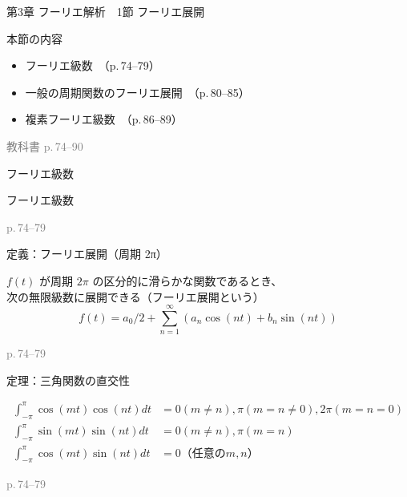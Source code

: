 \documentclass[aspectratio=43,professionalfonts,handout]{beamer}
\begin{document}
\begin{frame}{第3章 フーリエ解析　1節 フーリエ展開}
  \begin{block}{本節の内容}
  \begin{itemize}
    \item フーリエ級数　（p.\,74--79）
    \item 一般の周期関数のフーリエ展開　（p.\,80--85）
    \item 複素フーリエ級数　（p.\,86--89）
  \end{itemize}
  \end{block}
  \vfill\hfill{\scriptsize \textcolor{gray}{教科書 p.\,74--90}}
\end{frame}

\begin{frame}{フーリエ級数}
  \begin{block}{}
  {\large フーリエ級数}
  \end{block}
  \vfill\hfill{\scriptsize \textcolor{gray}{p.\,74--79}}
\end{frame}

\begin{frame}{定義：フーリエ展開（周期 2π）}
  \begin{block}{}
  $f(t)$ が周期 $2\pi$ の区分的に滑らかな関数であるとき、\\[2pt]
  次の無限級数に展開できる（フーリエ展開という）\\[2pt]
  \[
    f(t) = a_{0}/2 + \sum_{n=1}^\infty (a_{n}\cos(nt) + b_{n}\sin(nt))
  \]
  \end{block}
  \vfill\hfill{\scriptsize \textcolor{gray}{p.\,74--79}}
\end{frame}

\begin{frame}{定理：三角関数の直交性}
  \begin{block}{}
  \begin{align*}
    \int_{-\pi}^{\pi} \cos(mt)\cos(nt) dt &= { 0 (m \neq n), \pi (m = n \neq 0), 2\pi (m = n = 0) } \\
    \int_{-\pi}^{\pi} \sin(mt)\sin(nt) dt &= { 0 (m \neq n), \pi (m = n) } \\
    \int_{-\pi}^{\pi} \cos(mt)\sin(nt) dt &= 0  （任意の m, n）
  \end{align*}
  \end{block}
  \vfill\hfill{\scriptsize \textcolor{gray}{p.\,74--79}}
\end{frame}
\end{document}
